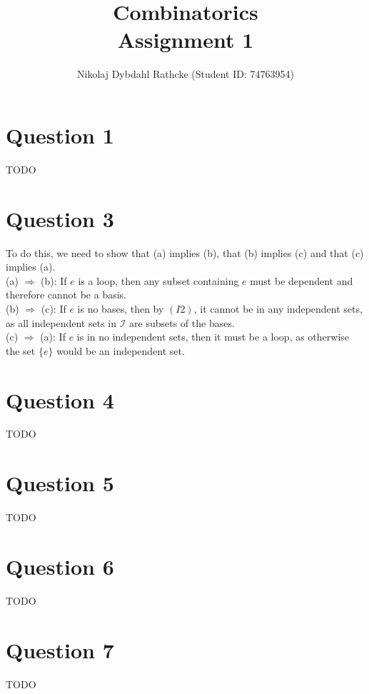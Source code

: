 \documentclass[a4paper, fleqn]{article}
\author{Nikolaj Dybdahl Rathcke (Student ID: 74763954)}
\title{Combinatorics \\ Assignment 1}
\begin{document}
\maketitle

\section*{Question 1}
TODO

\section*{Question 3}
To do this, we need to show that (a) implies (b), that (b) implies (c) and that (c) implies (a).\\
(a) $\Rightarrow$ (b): If $e$ is a loop, then any subset containing $e$ must be dependent and therefore cannot be a basis. \\
(b) $\Rightarrow$ (c): If $e$ is no bases, then by $(I2)$, it cannot be in any independent sets, as all independent sets in $\mathcal{I}$ are subsets of the bases. \\
(c) $\Rightarrow$ (a): If $e$ is in no independent sets, then it must be a loop, as otherwise the set $\{e\}$ would be an independent set.

\section*{Question 4}
TODO

\section*{Question 5}
TODO

\section*{Question 6}
TODO

\section*{Question 7}
TODO
\end{document}
